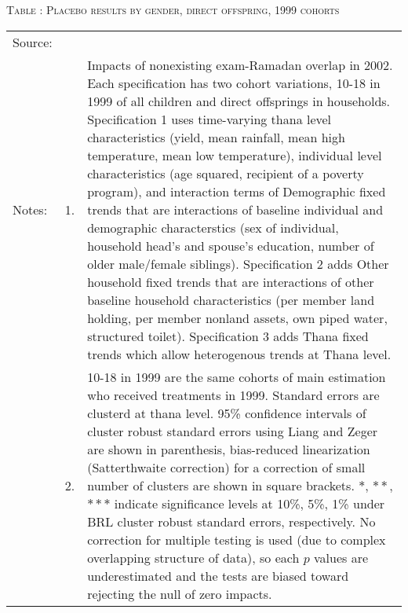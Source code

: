 \begin{table}
\hfil\textsc{\footnotesize Table \thetable: Placebo results by gender, direct offspring, 1999 cohorts\label{PlaceboResultsDirect1999Table}}\\
\setlength{\tabcolsep}{1pt}
\renewcommand{\arraystretch}{.55}
\hspace{-1cm}

\renewcommand{\arraystretch}{1}
\hfil\begin{tabular}{>{\hfill\scriptsize}p{1cm}<{}>{\hfill\scriptsize}p{.5cm}<{}>{\scriptsize}p{12cm}<{\hfill}}
Source:& \multicolumn{2}{l}{\scriptsize Compiled from IFPRI data. Various cohorts.}\\[-1ex]
Notes:& 1. & Impacts of nonexisting exam-Ramadan overlap in 2002. Each specification has two cohort variations, \textsf{10-18 in 1999} of all children and direct offsprings in households. \textsf{Specification 1} uses time-varying thana level characteristics (yield, mean rainfall, mean high temperature, mean low temperature), individual level characteristics (age squared, recipient of a poverty program), and interaction terms of \textsf{Demographic fixed trends} that are interactions of baseline individual and demographic characterstics (sex of individual, household head's and spouse's education, number of older male/female siblings). \textsf{Specification 2} adds \textsf{Other household fixed trends} that are interactions of other baseline household characteristics (per member land holding, per member nonland assets, own piped water, structured toilet). \textsf{Specification 3} adds \textsf{Thana fixed trends} which allow heterogenous trends at Thana level. \\[-1ex]
& 2. & \textsf{10-18 in 1999} are the same cohorts of main estimation who received treatments in 1999. Standard errors are clusterd at thana level. 95\% confidence intervals of cluster robust standard errors using Liang and Zeger are shown in parenthesis, bias-reduced linearization (Satterthwaite correction) for a correction of small number of clusters are shown in square brackets. $*$, $**$, $***$ indicate significance levels at 10\%, 5\%, 1\% under BRL cluster robust standard errors, respectively. No correction for multiple testing is used (due to complex overlapping structure of data), so each $p$ values are underestimated and the tests are biased toward rejecting the null of zero impacts. 
\end{tabular}
\end{table}

